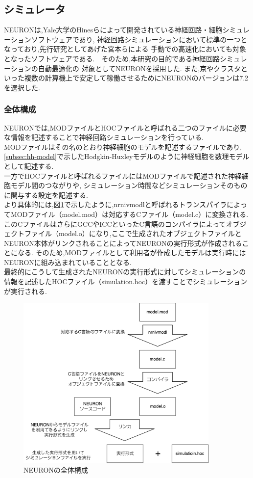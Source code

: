 \subsection{シミュレータ}
\label{subsec:neuron}
NEURONは,Yale大学のHinesらによって開発されている神経回路・細胞シミュレーションソフトウェアであり,
神経回路シミュレーションにおいて標準の一つとなっており,先行研究としてあげた宮本らによる
手動での高速化においても対象となったソフトウェアである.　そのため,本研究の目的である神経回路シミュレーションの自動最適化の
対象としてNEURONを採用した. また,京やクラスタといった複数の計算機上で安定して稼働させるためにNEURONのバージョンは7.2を選択した.\\

\subsubsection{全体構成}
NEURONでは,MODファイルとHOCファイルと呼ばれる二つのファイルに必要な情報を記述することで神経回路シミュレーションを行っている.\\
MODファイルはその名のとおり神経細胞のモデルを記述するファイルであり, \ref{subsec:hh-model}で示したHodgkin-Huxleyモデルのように神経細胞を数理モデルとして記述する.\\
一方でHOCファイルと呼ばれるファイルにはMODファイルで記述された神経細胞モデル間のつながりや,
シミュレーション時間などシミュレーションそのものに関与する設定を記述する.\\
より具体的には,図\ref{fig:neuron}で示したように,nrnivmodlと呼ばれるトランスパイラによってMODファイル（model.mod）は対応するCファイル（model.c）に変換される.
このCファイルはさらにGCCやICCといったC言語のコンパイラによってオブジェクトファイル（model.o）になり,ここで生成されたオブジェクトファイルと
NEURON本体がリンクされることによってNEURONの実行形式が作成されることになる.
そのため,MODファイルとして利用者が作成したモデルは実行時にはNEURONに組み込まれていることとなる.\\
最終的にこうして生成されたNEURONの実行形式に対してシミュレーションの情報を記述したHOCファイル（simulation.hoc）を渡すことでシミュレーションが実行される.\\
\clearpage
\begin{figure}[htb]
  \begin{center}
    \includegraphics[width=10cm]{./images/neuron}
    \caption{NEURONの全体構成}
    \label{fig:neuron}
  \end{center}
\end{figure}
